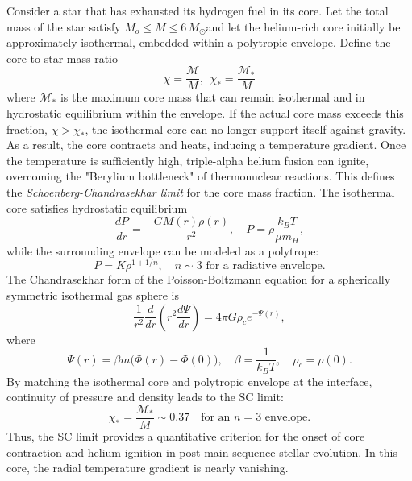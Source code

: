 \documentclass[12pt,a4paper]{article}
\numberwithin{equation}{section}
\begin{document}
Consider a star that has exhausted its hydrogen fuel in its core. Let the total mass of the star satisfy $M_o \le M \le 6\,M_\odot $and let the helium-rich core initially be approximately isothermal, embedded within a polytropic envelope. Define the core-to-star mass ratio
\begin{equation}
\chi = \frac{\mathcal{M}}{M},~~\chi_{*}=\frac{\mathcal{M}_{*}}{M}
\end{equation}
where $\mathcal{M}_*$ is the maximum core mass that can remain isothermal and in hydrostatic equilibrium within the envelope. If the actual core mass exceeds this fraction, $\chi > \chi_*$, the isothermal core can no longer support itself against gravity. As a result, the core contracts and heats, inducing a temperature gradient. Once the temperature is sufficiently high, triple-alpha helium fusion can ignite, overcoming the "Berylium bottleneck" of thermonuclear reactions. This defines the \emph{Schoenberg-Chandrasekhar limit} for the core mass fraction. The isothermal core satisfies hydrostatic equilibrium
\begin{equation}
\frac{dP}{dr} = - \frac{G M(r) \rho(r)}{r^2}, \quad P = \rho \frac{k_B T}{\mu m_H},
\end{equation}
while the surrounding envelope can be modeled as a polytrope:
\begin{equation}
P = K \rho^{1 + 1/n}, \quad n \sim 3 \text{ for a radiative envelope}.
\end{equation}
The Chandrasekhar form of the Poisson-Boltzmann equation for a spherically symmetric isothermal gas sphere is
\begin{equation}
\frac{1}{r^2}\frac{d}{dr}\left( r^2 \frac{d\Psi}{dr} \right) = 4 \pi G \rho_c e^{-\Psi(r)},
\end{equation}
where
\begin{equation}
\Psi(r) = \beta m \bigl( \Phi(r) - \Phi(0) \bigr), \quad \beta = \frac{1}{k_B T}, \quad \rho_c = \rho(0).
\end{equation}
By matching the isothermal core and polytropic envelope at the interface, continuity of pressure and density leads to the SC limit:
\begin{equation}
\chi_* = \frac{\mathcal{M}_*}{M} \sim 0.37 \quad \text{for an } n=3 \text{ envelope}.
\end{equation}
Thus, the SC limit provides a quantitative criterion for the onset of core contraction and helium ignition in post-main-sequence stellar evolution.
In this core, the radial temperature gradient is nearly vanishing.
\end{document}
